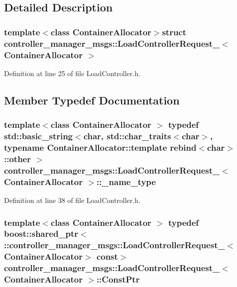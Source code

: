 \subsection{\-Detailed \-Description}
\subsubsection*{template$<$class Container\-Allocator$>$struct controller\-\_\-manager\-\_\-msgs\-::\-Load\-Controller\-Request\-\_\-$<$ Container\-Allocator $>$}



\-Definition at line 25 of file \-Load\-Controller.\-h.



\subsection{\-Member \-Typedef \-Documentation}
\subsubsection[{\-\_\-name\-\_\-type}]{\setlength{\rightskip}{0pt plus 5cm}template$<$class Container\-Allocator $>$ typedef std\-::basic\-\_\-string$<$char, std\-::char\-\_\-traits$<$char$>$, typename \-Container\-Allocator\-::template rebind$<$char$>$\-::other $>$ {\bf controller\-\_\-manager\-\_\-msgs\-::\-Load\-Controller\-Request\-\_\-}$<$ \-Container\-Allocator $>$\-::{\bf \-\_\-name\-\_\-type}}\label{structcontroller__manager__msgs_1_1LoadControllerRequest___aea6da1be212897e9ba11313f5b10a341}


\-Definition at line 38 of file \-Load\-Controller.\-h.

\subsubsection[{\-Const\-Ptr}]{\setlength{\rightskip}{0pt plus 5cm}template$<$class Container\-Allocator $>$ typedef boost\-::shared\-\_\-ptr$<$ \-::{\bf controller\-\_\-manager\-\_\-msgs\-::\-Load\-Controller\-Request\-\_\-}$<$\-Container\-Allocator$>$ const$>$ {\bf controller\-\_\-manager\-\_\-msgs\-::\-Load\-Controller\-Request\-\_\-}$<$ \-Container\-Allocator $>$\-::{\bf \-Const\-Ptr}}\label{structcontroller__manager__msgs_1_1LoadControllerRequest___ab19b253715d8ef33b24cd28f7f9ca57c}



